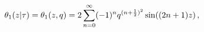 \[\mathop{\theta_{1}\/}\nolimits\!\left(z\middle|\tau\right)=\mathop{\theta_{1}%
\/}\nolimits\!\left(z,q\right)=2\sum\limits_{n=0}^{\infty}(-1)^{n}q^{(n+\frac{%
1}{2})^{2}}\mathop{\sin\/}\nolimits\!\left((2n+1)z\right),\]